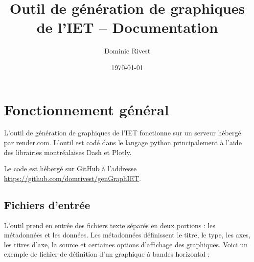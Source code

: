 \documentclass[11pt]{article}
\title{Outil de génération de graphiques de l'IET -- Documentation}
\author{ Dominic Rivest }
\date{\today}
\begin{document}
\maketitle	

\tableofcontents
\pagebreak


\section{Fonctionnement général}

L'outil de génération de graphiques de l'IET fonctionne sur un serveur hébergé par render.com. L'outil est codé dans le langage python principalement à l'aide des librairies montréalaises Dash et Plotly.

Le code est hébergé sur GitHub à l'addresse \href{https://github.com/domrivest/genGraphIET}{https://github.com/domrivest/genGraphIET}.

\subsection{Fichiers d'entrée}
L'outil prend en entrée des fichiers texte séparés en deux portions : les métadonnées et les données. Les métadonnées définissent le titre, le type, les axes, les titres d'axe, la source et certaines options d'affichage des graphiques. Voici un exemple de fichier de définition d'un graphique à bandes horizontal : 
\end{document}
